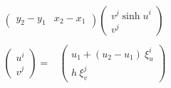 \documentclass [10pt,letterpaper]{article}
\begin{document}
\begin{subequations}
\begin{align}
\begin{split}
\begin{pmatrix}
				y_2-y_1 	& 	x_2-x_1		
			\end{pmatrix}
			\begin{pmatrix}
				v^j \sinh{u^i}				\\
				v^j
			\end{pmatrix}
		\end{split}
		\\
		\begin{split} 
			\begin{pmatrix}
				u^i					\\
				v^j
			\end{pmatrix}
			=&
			\begin{pmatrix}
				u_1
				+ 
				( u_2 - u_1 )
				\ \xi_u^i				\\
				h
				\ \xi_v^j
			\end{pmatrix}
		\end{split}
	\end{align}
\end{subequations}
\end{document}
